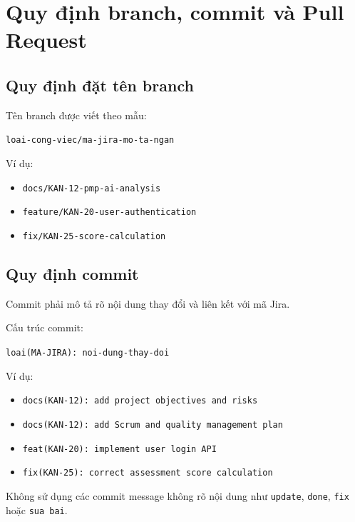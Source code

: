 \section{Quy định branch, commit và Pull Request}

\subsection{Quy định đặt tên branch}

Tên branch được viết theo mẫu:

\begin{center}
	\texttt{loai-cong-viec/ma-jira-mo-ta-ngan}
\end{center}

Ví dụ:

\begin{itemize}
	\item \texttt{docs/KAN-12-pmp-ai-analysis}
	\item \texttt{feature/KAN-20-user-authentication}
	\item \texttt{fix/KAN-25-score-calculation}
\end{itemize}

\subsection{Quy định commit}

Commit phải mô tả rõ nội dung thay đổi và liên kết với mã Jira.

Cấu trúc commit:

\begin{center}
	\texttt{loai(MA-JIRA): noi-dung-thay-doi}
\end{center}

Ví dụ:

\begin{itemize}
	\item \texttt{docs(KAN-12): add project objectives and risks}
	\item \texttt{docs(KAN-12): add Scrum and quality management plan}
	\item \texttt{feat(KAN-20): implement user login API}
	\item \texttt{fix(KAN-25): correct assessment score calculation}
\end{itemize}

Không sử dụng các commit message không rõ nội dung như
\texttt{update}, \texttt{done}, \texttt{fix} hoặc \texttt{sua bai}.

